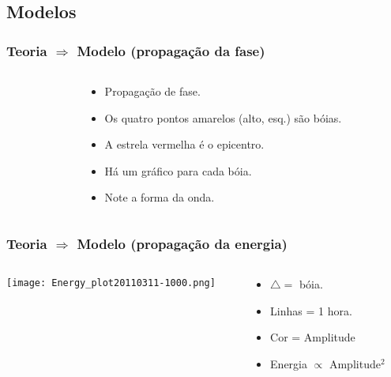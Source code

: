 \documentclass{beamer}
\begin{document}
\subsection{Modelos}
\begin{frame}
  \frametitle{Teoria $\Rightarrow$ Modelo (propagação da fase)}
  \begin{columns}
    \begin{column}{7.5cm}
    \end{column}
    \begin{column}{4.5cm}
      \begin{itemize}\setlength{\itemsep}{2.5ex}
      \item Propagação de \alert{fase}.
      \item Os quatro pontos amarelos (alto, esq.) são bóias.
      \item A estrela vermelha é o epicentro.
      \item Há um gráfico para cada bóia.
      \item Note a forma da onda.
      \end{itemize}
    \end{column}
  \end{columns}
\end{frame}
\begin{frame}
  \frametitle{Teoria $\Rightarrow$ Modelo (propagação da energia)}
  \begin{columns}
    \begin{column}{9cm}
      \texttt{[image: Energy\_plot20110311-1000.png]}
    \end{column}
    \begin{column}{3cm}
      \begin{itemize}\setlength{\itemsep}{3ex}
      \item $\triangle = $ bóia.
      \item Linhas = 1 hora.
      \item Cor = Amplitude
      \item \alert{Energia $\propto$ Amplitude$^2$}
      \end{itemize}
    \end{column}
  \end{columns}
\end{frame}
\end{document}
